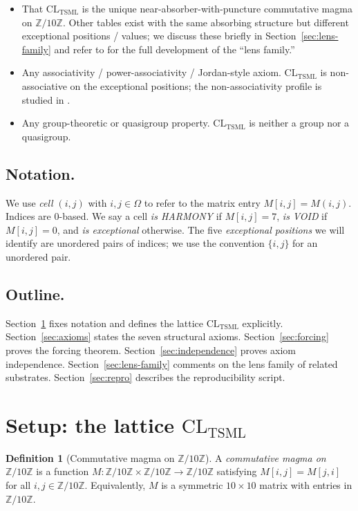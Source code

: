 \documentclass[11pt,reqno]{amsart}
\theoremstyle{plain}
\theoremstyle{definition}
\newtheorem{definition}[theorem]{Definition}
\theoremstyle{remark}
\newcommand{\Z}{\mathbb{Z}}
\newcommand{\TSML}{\mathrm{TSML}}
\newcommand{\CL}{\mathrm{CL}}
\begin{document}
\begin{itemize}
\item That $\CL_{\TSML}$ is the unique near-absorber-with-puncture
commutative magma on $\Z/10\Z$. Other tables exist with the same
absorbing structure but different exceptional positions / values; we
discuss these briefly in Section~\ref{sec:lens-family} and refer to
\cite{SandersGishFourCore} for the full development of the
``lens family.''
\item Any associativity / power-associativity / Jordan-style axiom.
$\CL_{\TSML}$ is non-associative on the exceptional positions; the
non-associativity profile is studied in
\cite{SandersGishFourCore}.
\item Any group-theoretic or quasigroup property. $\CL_{\TSML}$ is
neither a group nor a quasigroup.
\end{itemize}

\subsection{Notation.}
We use \emph{cell} $(i, j)$ with $i, j \in \Omega$ to refer to the
matrix entry $M[i, j] = M(i, j)$. Indices are $0$-based. We say a
cell \emph{is HARMONY} if $M[i, j] = 7$, \emph{is VOID} if $M[i, j]
= 0$, and \emph{is exceptional} otherwise. The five \emph{exceptional
positions} we will identify are unordered pairs of indices; we use
the convention $\{i, j\}$ for an unordered pair.

\subsection{Outline.}
Section~\ref{sec:setup} fixes notation and defines the lattice
$\CL_{\TSML}$ explicitly. Section~\ref{sec:axioms} states the seven
structural axioms. Section~\ref{sec:forcing} proves the forcing
theorem. Section~\ref{sec:independence} proves axiom independence.
Section~\ref{sec:lens-family} comments on the lens family of
related substrates. Section~\ref{sec:repro} describes the
reproducibility script.

\section{Setup: the lattice $\CL_{\TSML}$}
\label{sec:setup}

\begin{definition}[Commutative magma on $\Z/10\Z$]
\label{def:cm}
A \emph{commutative magma on $\Z/10\Z$} is a function
$M : \Z/10\Z \times \Z/10\Z \to \Z/10\Z$ satisfying $M[i, j] = M[j, i]$
for all $i, j \in \Z/10\Z$. Equivalently, $M$ is a symmetric
$10 \times 10$ matrix with entries in $\Z/10\Z$.
\end{definition}
\end{document}
